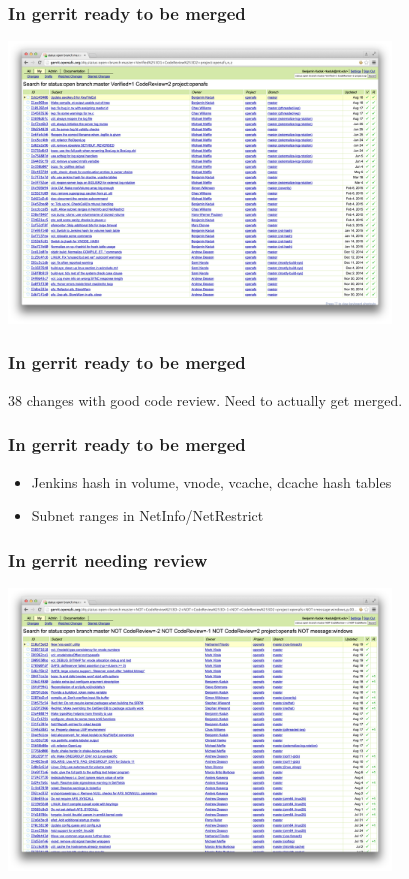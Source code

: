 \documentclass{beamer}
\begin{document}
\begin{frame}
\frametitle{In gerrit ready to be merged}
\includegraphics[width=4in]{gerrit-approved}
\end{frame}

\begin{frame}
\frametitle{In gerrit ready to be merged}
38 changes with good code review.
\vspace{1em}
Need to actually get merged.
\end{frame}

\begin{frame}
\frametitle{In gerrit ready to be merged}
\begin{itemize}
\item{Jenkins hash in volume, vnode, vcache, dcache hash tables}
\item{Subnet ranges in NetInfo/NetRestrict}
\end{itemize}
\end{frame}

\begin{frame}
\frametitle{In gerrit needing review}
\includegraphics[width=4in]{gerrit-needsreview}
\end{frame}
\end{document}
